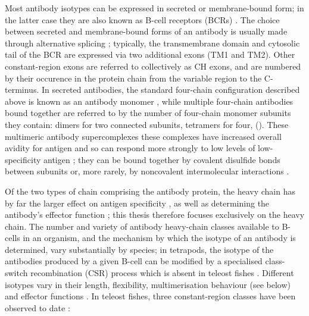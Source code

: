 Most antibody isotypes can be expressed in secreted or membrane-bound form; in the latter case they are also known as B-cell receptors (BCRs) \parencite{bengten2015fishantibodies}. The choice between secreted and membrane-bound forms of an antibody is usually made through alternative splicing \parencite{bengten2015fishantibodies,mashoof2016immunoglobulins}; typically, the transmembrane domain and cytosolic tail of the BCR are expressed via two additional exons (TM1 and TM2). Other constant-region exons are referred to collectively as CH exons, and are numbered by their occurence in the protein chain from the variable region to the C-terminus. In secreted antibodies, the standard four-chain configuration described above is known as an antibody monomer \parencite{mix2006immunoglobulins}, while multiple four-chain antibodies bound together are referred to by the number of four-chain monomer subunits they contain: dimers for two connected subunits, tetramers for four, \etc \parencite{mix2006immunoglobulins,schroeder2010immunoglobulins} (). These multimeric antibody supercomplexes these complexes have increased overall avidity for antigen and so can respond more strongly to low levels of low-specificity antigen \parencite{mix2006immunoglobulins}; they can be bound together by covalent disulfide bonds between subunits \parencite{schroeder2010immunoglobulins} or, more rarely, by noncovalent intermolecular interactions \parencite{zhang2010igtgut}.

Of the two types of chain comprising the antibody protein, the heavy chain has by far the larger effect on antigen specificity \parencite{shirai1999h3}, as well as determining the antibody's effector function  \parencite{schroeder2010immunoglobulins}; this thesis therefore focuses exclusively on the heavy chain. The number and variety of antibody heavy-chain classes available to B-cells in an organism, and the mechanism by which the isotype of an antibody is determined, vary substantially by species; in tetrapods, the isotype of the antibodies produced by a given B-cell can be modified by a specialised class-switch recombination (CSR) process which is absent in teleost fishes \parencite{senger2015switching}. Different isotypes vary in their length, flexibility, multimerisation behaviour (see below) and effector functions \parencite{schroeder2010immunoglobulins,senger2015switching}. In teleost fishes, three constant-region classes have been observed to date \parencite{bengten2015fishantibodies,mashoof2016immunoglobulins,fillatreau2013astonishing}:


